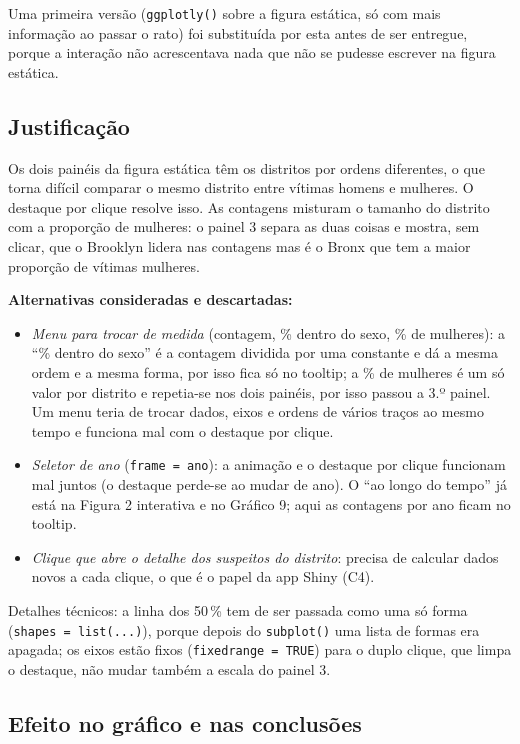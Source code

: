 \documentclass[11pt,a4paper]{article}
\begin{document}
Uma primeira versão (\texttt{ggplotly()} sobre a figura estática, só com mais informação ao passar
o rato) foi substituída por esta antes de ser entregue, porque a interação não acrescentava nada
que não se pudesse escrever na figura estática.

\subsection*{Justificação}

Os dois painéis da figura estática têm os distritos por ordens diferentes, o que torna difícil
comparar o mesmo distrito entre vítimas homens e mulheres. O destaque por clique resolve isso.
As contagens misturam o tamanho do distrito com a proporção de mulheres: o painel 3 separa as duas
coisas e mostra, sem clicar, que o Brooklyn lidera nas contagens mas é o Bronx que tem a maior
proporção de vítimas mulheres.

\textbf{Alternativas consideradas e descartadas:}
\begin{itemize}
  \item \emph{Menu para trocar de medida} (contagem, \% dentro do sexo, \% de mulheres): a
        ``\% dentro do sexo'' é a contagem dividida por uma constante e dá a mesma ordem e a mesma
        forma, por isso fica só no tooltip; a \% de mulheres é um só valor por distrito e repetia-se
        nos dois painéis, por isso passou a 3.º painel. Um menu teria de trocar dados, eixos e
        ordens de vários traços ao mesmo tempo e funciona mal com o destaque por clique.
  \item \emph{Seletor de ano} (\texttt{frame = ano}): a animação e o destaque por clique funcionam
        mal juntos (o destaque perde-se ao mudar de ano). O ``ao longo do tempo'' já está na
        Figura 2 interativa e no Gráfico 9; aqui as contagens por ano ficam no tooltip.
  \item \emph{Clique que abre o detalhe dos suspeitos do distrito}: precisa de calcular dados novos
        a cada clique, o que é o papel da app Shiny (C4).
\end{itemize}

Detalhes técnicos: a linha dos 50\,\% tem de ser passada como uma só forma
(\texttt{shapes = list(...)}), porque depois do \texttt{subplot()} uma lista de formas era apagada;
os eixos estão fixos (\texttt{fixedrange = TRUE}) para o duplo clique, que limpa o destaque, não
mudar também a escala do painel 3.

\subsection*{Efeito no gráfico e nas conclusões}
\end{document}
